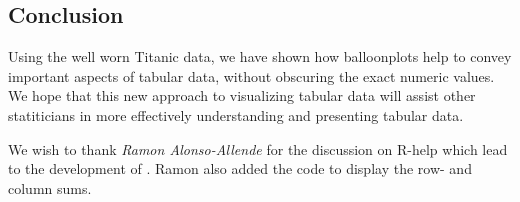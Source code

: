 \documentclass[a4paper]{report}
\begin{document}
\begin{article}
\section*{Conclusion}

Using the well worn Titanic data, we have shown how balloonplots
help to convey important aspects of tabular data, without obscuring
the exact numeric values. We hope that this new approach to
visualizing tabular data will assist other statiticians in more
effectively understanding and presenting tabular data.

We wish to thank \emph{Ramon Alonso-Allende}
 for the discussion on R-help which lead
to the development of . Ramon also added the code
to display the row- and column sums.

\address{Gregory R. Warnes, Pfizer Inc., USA\\
\\
       Nitin Jain, Pfizer Inc., USA\\
}



\end{article}
\end{document}
